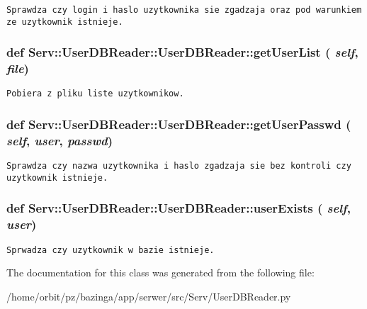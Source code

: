 \footnotesize\begin{verbatim}Sprawdza czy login i haslo uzytkownika sie zgadzaja oraz pod warunkiem ze uzytkownik istnieje.\end{verbatim}
\normalsize
 \hypertarget{class_serv_1_1_user_d_b_reader_1_1_user_d_b_reader_84890922ae8efd8ecec178874ec296f6}{
\subsubsection[{getUserList}]{\setlength{\rightskip}{0pt plus 5cm}def Serv::UserDBReader::UserDBReader::getUserList ( {\em self}, \/   {\em file})}}
\label{class_serv_1_1_user_d_b_reader_1_1_user_d_b_reader_84890922ae8efd8ecec178874ec296f6}




\footnotesize\begin{verbatim}Pobiera z pliku liste uzytkownikow.\end{verbatim}
\normalsize
 \hypertarget{class_serv_1_1_user_d_b_reader_1_1_user_d_b_reader_d77c35dbbb9ddf154ab8809463a254c0}{
\subsubsection[{getUserPasswd}]{\setlength{\rightskip}{0pt plus 5cm}def Serv::UserDBReader::UserDBReader::getUserPasswd ( {\em self}, \/   {\em user}, \/   {\em passwd})}}
\label{class_serv_1_1_user_d_b_reader_1_1_user_d_b_reader_d77c35dbbb9ddf154ab8809463a254c0}




\footnotesize\begin{verbatim}Sprawdza czy nazwa uzytkownika i haslo zgadzaja sie bez kontroli czy uzytkownik istnieje.\end{verbatim}
\normalsize
 \hypertarget{class_serv_1_1_user_d_b_reader_1_1_user_d_b_reader_e3a006e064956d5d09ad1bcaa4c3315f}{
\subsubsection[{userExists}]{\setlength{\rightskip}{0pt plus 5cm}def Serv::UserDBReader::UserDBReader::userExists ( {\em self}, \/   {\em user})}}
\label{class_serv_1_1_user_d_b_reader_1_1_user_d_b_reader_e3a006e064956d5d09ad1bcaa4c3315f}




\footnotesize\begin{verbatim}Sprwadza czy uzytkownik w bazie istnieje.\end{verbatim}
\normalsize
 

The documentation for this class was generated from the following file:\begin{CompactItemize}
\item 
/home/orbit/pz/bazinga/app/serwer/src/Serv/UserDBReader.py\end{CompactItemize}

